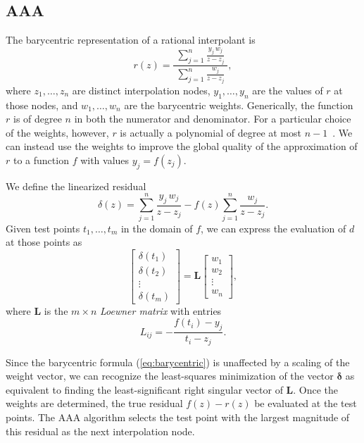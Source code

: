 \documentclass{juliacon}
\begin{document}
\subsection{AAA}
\label{sec:aaa}

The barycentric representation of a rational interpolant is
\begin{equation}
    \label{eq:barycentric}
    r(z) = \frac{ \; \displaystyle \sum_{j=1}^n \frac{y_j\, w_j}{z - z_j} \; }{ \displaystyle \sum_{j=1}^n \frac{w_j}{z - z_j} },
\end{equation}
where $z_1, \ldots, z_n$ are distinct interpolation nodes, $y_1, \ldots, y_n$ are the values of $r$ at those nodes, and $w_1, \ldots, w_n$ are the barycentric weights. Generically, the function $r$ is of degree $n$ in both the numerator and denominator. For a particular choice of the weights, however, $r$ is actually a polynomial of degree at most $n-1$~\cite{berrutBarycentricLagrange2004}. We can instead use the weights to improve the global quality of the approximation of $r$ to a function $f$ with values $y_j = f(z_j)$.

We define the linearized residual
\begin{equation}
    \label{eq:residual}
    \delta(z) = \sum_{j=1}^n \frac{y_j\, w_j}{z - z_j} - f(z) \sum_{j=1}^n \frac{w_j}{z - z_j}.
\end{equation}
Given test points $t_1, \ldots, t_m$ in the domain of $f$, we can express the evaluation of $d$ at those points as
\begin{equation}
    \label{eq:residuals}
    \begin{bmatrix} \delta(t_1) \\ \delta(t_2) \\ \vdots \\ \delta(t_m) \end{bmatrix} = \bm{L} \begin{bmatrix} w_1 \\ w_2 \\ \vdots \\ w_n \end{bmatrix},
\end{equation}
where $\bm{L}$ is the $m \times n$ \emph{Loewner matrix} with entries
\begin{equation}
    \label{eq:loewner}
    L_{ij} = - \frac{f(t_i) - y_j}{t_i - z_j}.
\end{equation}

Since the barycentric formula (\ref{eq:barycentric}) is unaffected by a scaling of the weight vector, we can recognize the least-squares minimization of the vector $\bm{\delta}$ as equivalent to finding the least-significant right singular vector of $\bm{L}$. Once the weights are determined, the true residual $f(z) - r(z)$ be evaluated at the test points. The AAA algorithm selects the test point with the largest magnitude of this residual as the next interpolation node.
\end{document}
